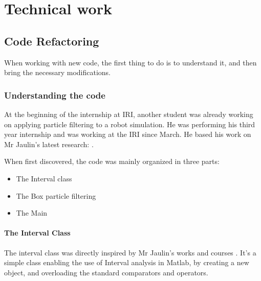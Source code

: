 \chapter{Technical work}

\label{technic}







\section{Code Refactoring}
When working with new code, the first thing to do is to understand it, and then bring the necessary modifications.
\subsection{Understanding the code}
At the beginning of the internship at IRI, another student was already working on applying particle filtering to a robot simulation.
He was performing his third year internship and was working at the IRI since March. He based his work on Mr Jaulin’s latest research:  \parencite{Base}.

When first discovered, the code was mainly organized in three parts:
\begin{itemize}
  \item The Interval class
  \item The Box particle filtering
  \item The Main
\end{itemize}
\subsubsection{The Interval Class}
The interval class was directly inspired by Mr Jaulin's works and courses \parencite{IAMOOC}.
It's a simple class enabling the use of Interval analysis in Matlab, by creating a new object, and overloading the standard comparators and operators.\\


